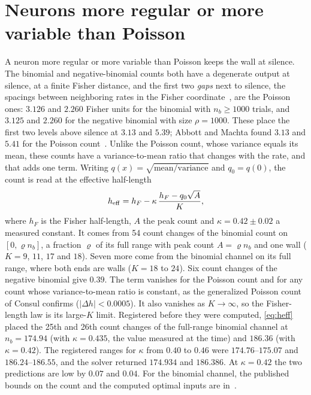 \documentclass[journal]{IEEEtran}
\begin{document}
\section{Neurons more regular or more variable than Poisson}\label{sec:fano}
A neuron more regular or more variable than Poisson keeps the wall at silence. The binomial and negative-binomial counts both have a
degenerate output at silence, at a finite Fisher distance, and the first two \emph{gaps} next to silence, the spacings between
neighboring rates in the Fisher coordinate~\cite{Anscombe1948}, are the Poisson ones: $3.126$ and $2.260$ Fisher units for the binomial
with $n_b \ge 1000$ trials, and $3.125$ and $2.260$ for the negative binomial with size $\rho = 1000$. These place the first two levels
above silence at $3.13$ and $5.39$; Abbott and Machta found $3.13$ and $5.41$ for the Poisson count~\cite{AbbottMachta2019}. Unlike the Poisson count, whose
variance equals its mean, these counts have a variance-to-mean ratio that changes with the rate, and that adds one term. Writing
$q(x) = \sqrt{\text{mean}/\text{variance}}$ and $q_0 = q(0)$, the count is read at the effective half-length
\begin{equation}
h_{\rm eff} = h_F - \kappa\,\frac{h_F - q_0\sqrt A}{K},\label{eq:heff}
\end{equation}
where $h_F$ is the Fisher half-length, $A$ the peak count and $\kappa = 0.42 \pm 0.02$ a measured constant. It comes from 54 count changes of the
binomial count on $[0, \varrho n_b]$, a fraction $\varrho$ of its full range with peak count $A = \varrho n_b$ and one wall ($K = 9$,
$11$, $17$ and $18$). Seven more come from the binomial channel on its full range, where both ends are walls ($K = 18$ to $24$). Six
count changes of the negative binomial give $0.39$. The term vanishes for the Poisson count and for any count whose variance-to-mean ratio is
constant, as the generalized Poisson count of Consul confirms ($|\Delta h| < 0.0005$). It also vanishes as $K \to \infty$, so the
Fisher-length law is its large-$K$ limit. Registered before they were computed, \eqref{eq:heff} placed the 25th and 26th count changes
of the full-range binomial channel at $n_b = 174.94$ (with $\kappa = 0.435$, the value measured at the time) and $186.36$ (with
$\kappa = 0.42$). The registered ranges for $\kappa$ from $0.40$ to $0.46$ were $174.76$--$175.07$ and $186.24$--$186.55$, and the
solver returned $174.934$ and $186.386$. At $\kappa = 0.42$ the two predictions are low by $0.07$ and $0.04$. For the binomial channel, the published bounds on the count and the computed optimal inputs are
in~\cite{Zieder2024,Favano2026,Baniasadi2026}.
\end{document}
